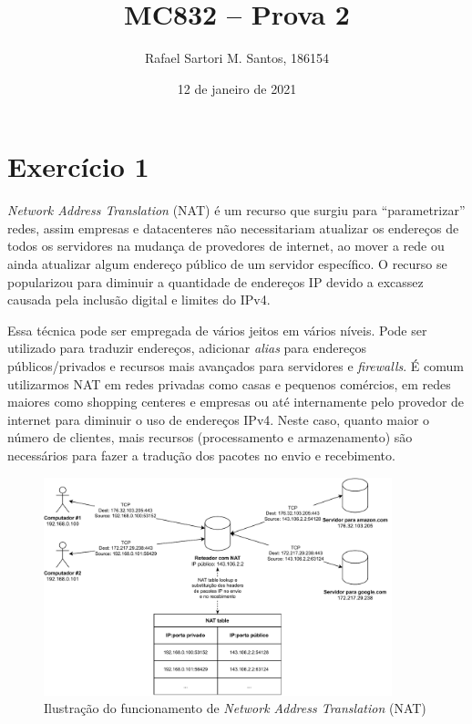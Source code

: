\documentclass[brazilian,a4paper]{article}
\title{MC832 -- Prova 2}
\author{Rafael Sartori M. Santos, 186154}
\date{12 de janeiro de 2021}
\begin{document}
\maketitle

\section*{Exercício 1}

\textit{Network Address Translation} (NAT) é um recurso que surgiu para ``parametrizar'' redes, assim empresas e datacenteres não necessitariam atualizar os endereços de todos os servidores na mudança de provedores de internet, ao mover a rede ou ainda atualizar algum endereço público de um servidor específico. O recurso se popularizou para diminuir a quantidade de endereços IP devido a excassez causada pela inclusão digital e limites do IPv4.

Essa técnica pode ser empregada de vários jeitos em vários níveis. Pode ser utilizado para traduzir endereços, adicionar \textit{alias} para endereços públicos/privados e recursos mais avançados para servidores e \textit{firewalls}. É comum utilizarmos NAT em redes privadas como casas e pequenos comércios, em redes maiores como shopping centeres e empresas ou até internamente pelo provedor de internet para diminuir o uso de endereços IPv4. Neste caso, quanto maior o número de clientes, mais recursos (processamento e armazenamento) são necessários para fazer a tradução dos pacotes no envio e recebimento.

\begin{figure}[h!]
    \centering
    \includegraphics[width=0.9\textwidth]{prova2-nat.pdf}
    \caption{Ilustração do funcionamento de \textit{Network Address Translation} (NAT)}
    \label{fig-nat}
\end{figure}
\end{document}
